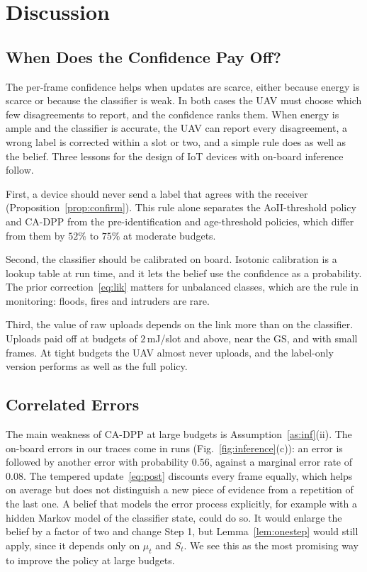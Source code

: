 \section{Discussion}\label{sec:discussion}
\subsection{When Does the Confidence Pay Off?}
The per-frame confidence helps when updates are scarce, either because energy is scarce or because the classifier is weak. In both cases the UAV must choose which few disagreements to report, and the confidence ranks them. When energy is ample and the classifier is accurate, the UAV can report every disagreement, a wrong label is corrected within a slot or two, and a simple rule does as well as the belief. Three lessons for the design of IoT devices with on-board inference follow.

First, a device should never send a label that agrees with the receiver (Proposition~\ref{prop:confirm}). This rule alone separates the AoII-threshold policy and CA-DPP from the pre-identification and age-threshold policies, which differ from them by $52\%$ to $75\%$ at moderate budgets.

Second, the classifier should be calibrated on board. Isotonic calibration is a lookup table at run time, and it lets the belief use the confidence as a probability. The prior correction~\eqref{eq:lik} matters for unbalanced classes, which are the rule in monitoring: floods, fires and intruders are rare.

Third, the value of raw uploads depends on the link more than on the classifier. Uploads paid off at budgets of $2$\,mJ/slot and above, near the GS, and with small frames. At tight budgets the UAV almost never uploads, and the label-only version performs as well as the full policy.

\subsection{Correlated Errors}
The main weakness of CA-DPP at large budgets is Assumption~\ref{as:inf}(ii). The on-board errors in our traces come in runs (Fig.~\ref{fig:inference}(c)): an error is followed by another error with probability $0.56$, against a marginal error rate of $0.08$. The tempered update~\eqref{eq:post} discounts every frame equally, which helps on average but does not distinguish a new piece of evidence from a repetition of the last one. A belief that models the error process explicitly, for example with a hidden Markov model of the classifier state, could do so. It would enlarge the belief by a factor of two and change Step 1, but Lemma~\ref{lem:onestep} would still apply, since it depends only on $\mu_t$ and $S_t$. We see this as the most promising way to improve the policy at large budgets.

